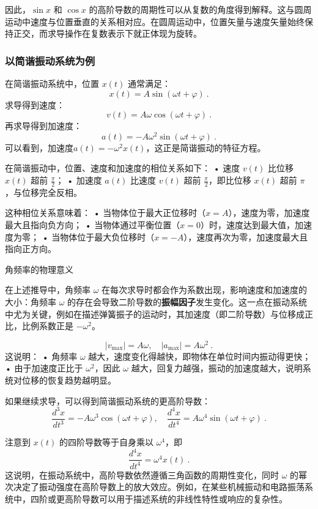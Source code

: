 因此，$\sin x$ 和 $\cos x$ 的高阶导数的周期性可以从复数的角度得到解释。这与圆周运动中速度与位置垂直的关系相对应。在圆周运动中，位置矢量与速度矢量始终保持正交，而求导操作在复数表示下就正体现为旋转。

\subsubsection{以简谐振动系统为例}

在简谐振动系统中，位置 $x(t)$ 通常满足：
\begin{equation}
x(t) = A \sin(\omega t + \varphi)~.
\end{equation}
求导得到速度：
\begin{equation}
v(t) = A\omega \cos(\omega t + \varphi)~.
\end{equation}
再求导得到加速度：
\begin{equation}
a(t) = -A\omega^2 \sin(\omega t + \varphi)~.
\end{equation}
可以看到，加速度$a(t) = -\omega^2 x(t)$，这正是简谐振动的特征方程。

在简谐振动中，位置、速度和加速度的相位关系如下：
	•	速度 $v(t)$ 比位移 $x(t)$ 超前 $\frac{\pi}{2}$；
	•	加速度 $a(t)$ 比速度 $v(t)$ 超前 $\frac{\pi}{2}$，即比位移 $x(t)$ 超前 $\pi$，与位移完全反相。

这种相位关系意味着：
	•	当物体位于最大正位移时（$x = A$），速度为零，加速度最大且指向负方向；
	•	当物体通过平衡位置（$x = 0$）时，速度达到最大值，加速度为零；
	•	当物体位于最大负位移时（$x = -A$），速度再次为零，加速度最大且指向正方向。

角频率的物理意义

在上述推导中，角频率 $\omega$ 在每次求导时都会作为系数出现，影响速度和加速度的大小：角频率 $\omega$ 的存在会导致二阶导数的\textbf{振幅因子}发生变化。这一点在振动系统中尤为关键，例如在描述弹簧振子的运动时，其加速度（即二阶导数）与位移成正比，比例系数正是 $-\omega^2$。

\begin{equation}
|v_{\max}| = A\omega, \quad |a_{\max}| = A\omega^2~.
\end{equation}
这说明：
	•	角频率 $\omega$ 越大，速度变化得越快，即物体在单位时间内振动得更快；
	•	由于加速度正比于 $\omega^2$，因此 $\omega$ 越大，回复力越强，振动的加速度越大，说明系统对位移的恢复趋势越明显。


如果继续求导，可以得到简谐振动系统的更高阶导数：
\begin{equation}
\frac{d^3x}{dt^3} = -A\omega^3 \cos(\omega t + \varphi),\quad
\frac{d^4x}{dt^4} = A\omega^4 \sin(\omega t + \varphi)~.
\end{equation}

注意到 $x(t)$ 的四阶导数等于自身乘以 $\omega^4$，即
\begin{equation}
\frac{d^4x}{dt^4} = \omega^4 x(t)~.
\end{equation}
这说明，在振动系统中，高阶导数依然遵循三角函数的周期性变化，同时 $\omega$ 的幂次决定了振动强度在高阶导数上的放大效应。例如，在某些机械振动和电路振荡系统中，四阶或更高阶导数可以用于描述系统的非线性特性或响应的复杂性。
